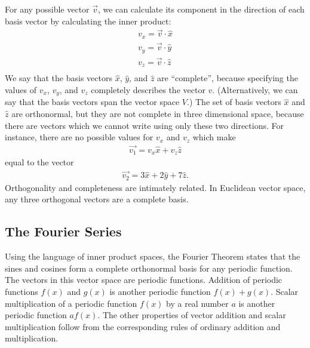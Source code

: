 \documentclass[12pt]{book}
\begin{document}
For any possible vector $\vec{v}$, we can calculate its component in the direction of each basis vector by calculating the inner product:
\begin{eqnarray*}
v_x = \vec{v} \cdot \hat{x} \\
v_y = \vec{v} \cdot \hat{y} \\
v_z = \vec{v} \cdot \hat{z} \\
\end{eqnarray*}
We say that the basis vectors $\hat{x}$, $\hat{y}$, and $\hat{z}$ are ``complete'', because specifying the values of $v_x$, $v_y$, and $v_z$ completely describes the vector $v$.  (Alternatively, we can say that the basis vectors span the vector space $V$.)  The set of basis vectors $\hat{x}$ and $\hat{z}$ are orthonormal, but they are not complete in three dimensional space, because there are vectors which we cannot write using only these two directions.  For instance, there are no possible values for $v_x$ and $v_z$
which make
\begin{eqnarray*}
 \vec{v_1} = v_x \hat{x} + v_z \hat{z}
\end{eqnarray*}
equal to the vector
\begin{eqnarray*}
 \vec{v_2} = 3 \hat{x} + 2 \hat{y} + 7 \hat{z}.
\end{eqnarray*}
Orthogonality and completeness are intimately related.  In Euclidean vector space, any three orthogonal vectors are a complete basis.
 
\subsection{The Fourier Series}

Using the language of inner product spaces, the Fourier Theorem states that the sines and cosines form a complete orthonormal basis for any periodic function.  The vectors in this vector space are periodic functions.  Addition of periodic functions $f(x)$ and $g(x)$ is another periodic function $f(x) + g(x)$.  Scalar multiplication of a periodic function $f(x)$ by a real number $a$ is another periodic function $a f(x)$.  The other properties of vector addition and scalar multiplication follow from the corresponding rules of ordinary addition and multiplication.
\end{document}
